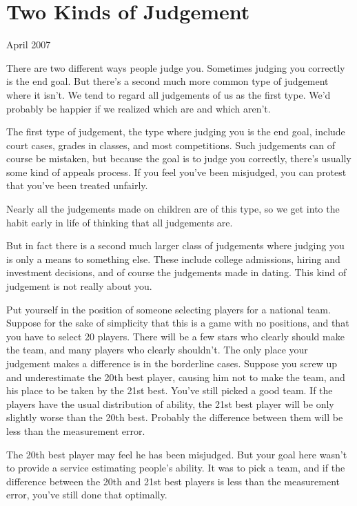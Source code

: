 \chapter{Two Kinds of Judgement}

April 2007

There are two different ways people judge you. Sometimes judging you
correctly is the end goal. But there's a second much more common type of
judgement where it isn't. We tend to regard all judgements of us as the
first type. We'd probably be happier if we realized which are and which
aren't.

The first type of judgement, the type where judging you is the end goal,
include court cases, grades in classes, and most competitions. Such
judgements can of course be mistaken, but because the goal is to judge
you correctly, there's usually some kind of appeals process. If you feel
you've been misjudged, you can protest that you've been treated
unfairly.

Nearly all the judgements made on children are of this type, so we get
into the habit early in life of thinking that all judgements are.

But in fact there is a second much larger class of judgements where
judging you is only a means to something else. These include college
admissions, hiring and investment decisions, and of course the
judgements made in dating. This kind of judgement is not really about
you.

Put yourself in the position of someone selecting players for a national
team. Suppose for the sake of simplicity that this is a game with no
positions, and that you have to select 20 players. There will be a few
stars who clearly should make the team, and many players who clearly
shouldn't. The only place your judgement makes a difference is in the
borderline cases. Suppose you screw up and underestimate the 20th best
player, causing him not to make the team, and his place to be taken by
the 21st best. You've still picked a good team. If the players have the
usual distribution of ability, the 21st best player will be only
slightly worse than the 20th best. Probably the difference between them
will be less than the measurement error.

The 20th best player may feel he has been misjudged. But your goal here
wasn't to provide a service estimating people's ability. It was to pick
a team, and if the difference between the 20th and 21st best players is
less than the measurement error, you've still done that optimally.

